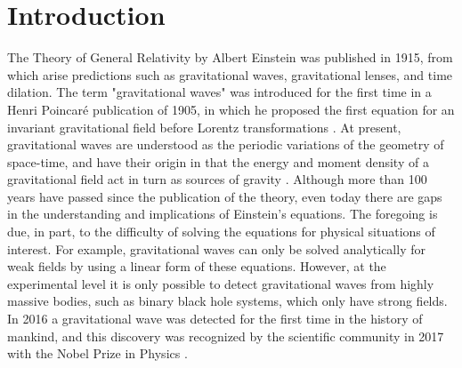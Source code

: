
%




\chapter{Introduction}
	The Theory of General Relativity by Albert Einstein was published in 1915, from which arise predictions such as gravitational waves, gravitational lenses, and time dilation. The term "gravitational waves" was introduced for the first time in a Henri Poincaré publication of 1905, in which he proposed the first equation for an invariant gravitational field before Lorentz transformations \cite{straumann2012general, bassan2014advanced}. At present, gravitational waves are understood as the periodic variations of the geometry of space-time, and have their origin in that the energy and moment density of a gravitational field act in turn as sources of gravity \cite{hoyng2006gravitational}. Although more than 100 years have passed since the publication of the theory, even today there are gaps in the understanding and implications of Einstein's equations. The foregoing is due, in part, to the difficulty of solving the equations for physical situations of interest. For example, gravitational waves can only be solved analytically for weak fields by using a linear form of these equations. However, at the experimental level it is only possible to detect gravitational waves from highly massive bodies, such as binary black hole systems, which only have strong fields. In 2016 a gravitational wave was detected for the first time in the history of mankind, and this discovery was recognized by the scientific community in 2017 with the Nobel Prize in Physics \cite{brugmann2018fundamentals}.
	
